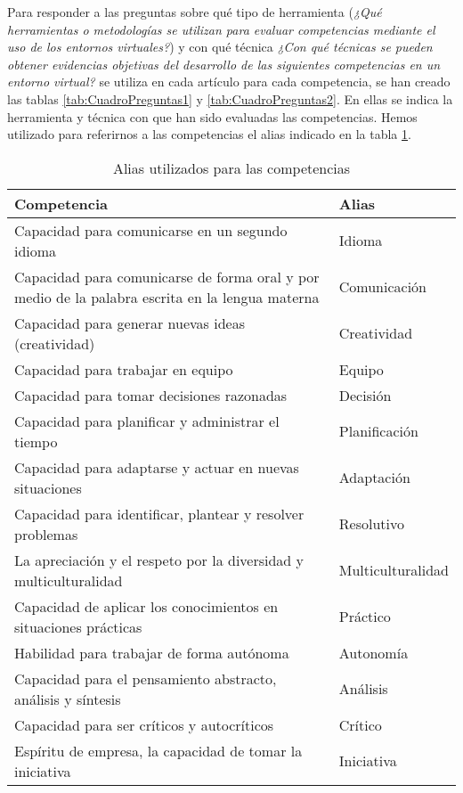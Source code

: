 Para responder a las preguntas sobre qué tipo de herramienta (\emph{¿Qué herramientas o metodologías se utilizan para evaluar competencias mediante el uso de los entornos virtuales?}) y con qué técnica \emph{¿Con qué técnicas se pueden obtener evidencias objetivas del desarrollo de las siguientes competencias en un entorno virtual?} se utiliza en cada artículo para cada competencia, se han creado las tablas \ref{tab:CuadroPreguntas1} y \ref{tab:CuadroPreguntas2}. En ellas se indica la herramienta y técnica con que han sido evaluadas las competencias. Hemos utilizado para referirnos a las competencias el alias indicado en la tabla \ref{tab:CuadroAlias}.


\begin{table}[H]
  \begin{center}
  \begin{tabular}{| m{10cm} | l |}
    \hline
    Competencia & Alias \\
    \hline
    \hline 
    Capacidad para comunicarse en un segundo idioma & Idioma \\
    \hline
    Capacidad para comunicarse de forma oral y por medio de la palabra escrita en la lengua materna & Comunicación \\
    \hline 
    Capacidad para generar nuevas ideas (creatividad) & Creatividad\\
    \hline
    Capacidad para trabajar en equipo & Equipo \\
    \hline
    Capacidad para tomar decisiones razonadas & Decisión \\
    \hline
    Capacidad para planificar y administrar el tiempo & Planificación \\
    \hline
    Capacidad para adaptarse y actuar en nuevas situaciones & Adaptación\\
    \hline
    Capacidad para identificar, plantear y resolver problemas & Resolutivo \\
    \hline
    La apreciación y el respeto por la diversidad y multiculturalidad & Multiculturalidad\\
    \hline
    Capacidad de aplicar los conocimientos en situaciones prácticas & Práctico \\
    \hline
    Habilidad para trabajar de forma autónoma & Autonomía \\
    \hline
    Capacidad para el pensamiento abstracto, análisis y síntesis  & Análisis\\
    \hline
    Capacidad para ser críticos y autocríticos & Crítico \\
    \hline
    Espíritu de empresa, la capacidad de tomar la iniciativa & Iniciativa \\
    \hline
  \end{tabular}
\end{center}
\caption{Alias utilizados para las competencias}
\label{tab:CuadroAlias}
\end{table} 

